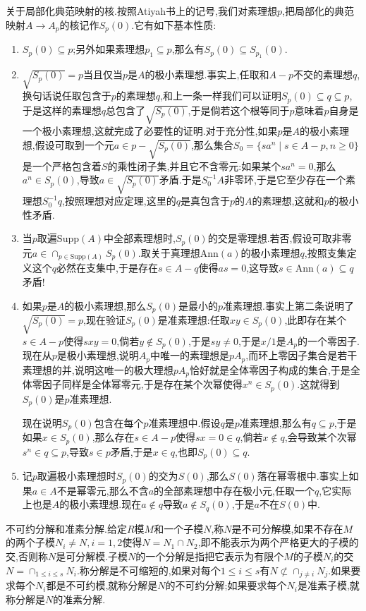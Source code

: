 关于局部化典范映射的核.按照Atiyah书上的记号,我们对素理想$p$,把局部化的典范映射$A\to A_p$的核记作$S_p(0)$.它有如下基本性质:
\begin{enumerate}
	\item $S_p(0)\subseteq p$;另外如果素理想$p_1\subseteq p$,那么有$S_p(0)\subseteq S_{p_1}(0)$.
	\item $\sqrt{S_p(0)}=p$当且仅当$p$是$A$的极小素理想.事实上,任取和$A-p$不交的素理想$q$,换句话说任取包含于$p$的素理想$q$,和上一条一样我们可以证明$S_p(0)\subseteq q\subseteq p$,于是这样的素理想$q$总包含了$\sqrt{S_p(0)}$,于是倘若这个根等同于$p$意味着$p$自身是一个极小素理想,这就完成了必要性的证明.对于充分性,如果$p$是$A$的极小素理想,假设可取到一个元$a\in p-\sqrt{S_p(0)}$,那么集合$S_0=\{sa^n\mid s\in A-p,n\ge0\}$是一个严格包含着$S$的乘性闭子集,并且它不含零元:如果某个$sa^n=0$,那么$a^n\in S_p(0)$,导致$a\in\sqrt{S_p(0)}$矛盾.于是$S_0^{-1}A$非零环,于是它至少存在一个素理想$S_0^{-1}q$,按照理想对应定理,这里的$q$是真包含于$p$的$A$的素理想,这就和$p$的极小性矛盾.
	\item 当$p$取遍$\mathrm{Supp}(A)$中全部素理想时,$S_p(0)$的交是零理想.若否,假设可取非零元$a\in\cap_{p\in\mathrm{Supp}(A)}S_p(0)$.取关于真理想$\mathrm{Ann}(a)$的极小素理想$q$,按照支集定义这个$q$必然在支集中,于是存在$s\in A-q$使得$as=0$,这导致$s\in\mathrm{Ann}(a)\subseteq q$矛盾!
	\item 如果$p$是$A$的极小素理想,那么$S_p(0)$是最小的$p$准素理想.事实上第二条说明了$\sqrt{S_p(0)}=p$,现在验证$S_p(0)$是准素理想:任取$xy\in S_p(0)$,此即存在某个$s\in A-p$使得$sxy=0$,倘若$y\not\in S_p(0)$,于是$sy\not=0$,于是$x/1$是$A_p$的一个零因子.现在从$p$是极小素理想,说明$A_p$中唯一的素理想是$pA_p$,而环上零因子集合是若干素理想的并,说明这唯一的极大理想$pA_p$恰好就是全体零因子构成的集合,于是全体零因子同样是全体幂零元,于是存在某个次幂使得$x^n\in S_p(0)$.这就得到$S_p(0)$是$p$准素理想.
	
	现在说明$S_p(0)$包含在每个$p$准素理想中.假设$q$是$p$准素理想,那么有$q\subseteq p$,于是如果$x\in S_p(0)$,那么存在$s\in A-p$使得$sx=0\in q$,倘若$x\not\in q$,会导致某个次幂$s^n\in q\subseteq p$,导致$s\in p$矛盾,于是$x\in q$,也即$S_p(0)\subseteq q$.
	\item 记$p$取遍极小素理想时$S_p(0)$的交为$S(0)$,那么$S(0)$落在幂零根中.事实上如果$a\in A$不是幂零元,那么不含$a$的全部素理想中存在极小元,任取一个$q$,它实际上也是$A$的极小素理想.现在$a\not\in q$导致$a\not\in S_q(0)$,于是$a$不在$S(0)$中.
\end{enumerate}

不可约分解和准素分解.给定$R$模$M$和一个子模$N$,称$N$是不可分解模,如果不存在$M$的两个子模$N_i\not=N,i=1,2$使得$N=N_1\cap N_2$,即不能表示为两个严格更大的子模的交,否则称$N$是可分解模.子模$N$的一个分解是指把它表示为有限个$M$的子模$N_i$的交$N=\cap_{1\le i\le s}N_i$.称分解是不可缩短的,如果对每个$1\le i\le s$有$N\not\subset\cap_{j\not=i}N_j$.如果要求每个$N_i$都是不可约模,就称分解是$N$的不可约分解;如果要求每个$N_i$是准素子模,就称分解是$N$的准素分解.

